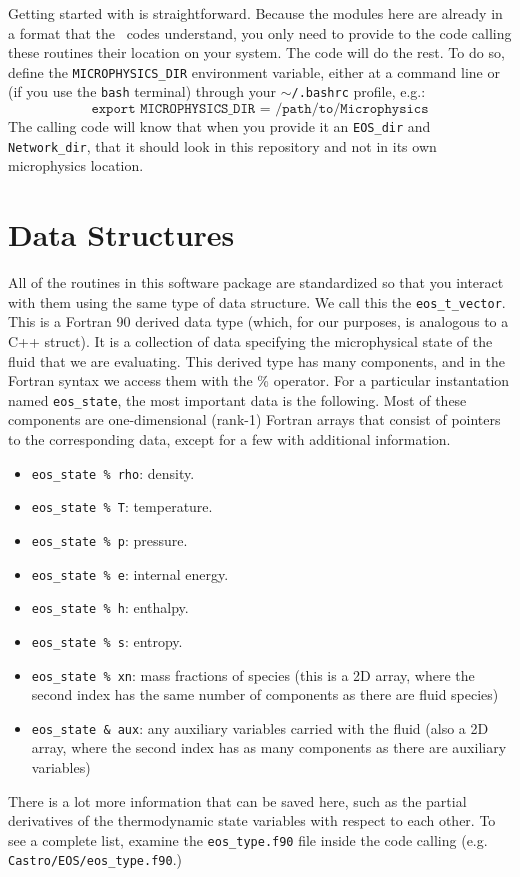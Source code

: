 \documentclass[11pt]{book}
\begin{document}
Getting started with \microphysics is straightforward. Because the
modules here are already in a format that the \boxlib\ codes
understand, you only need to provide to the code calling these
routines their location on your system. The code will do the rest. To
do so, define the {\tt MICROPHYSICS\_DIR} environment variable, either
at a command line or (if you use the {\tt bash} terminal) through your
{\tt $\sim$/.bashrc} profile, e.g.:
\begin{equation*}
  \texttt{export MICROPHYSICS\_DIR = /path/to/Microphysics}
\end{equation*}
The calling code will know that when you provide it an {\tt EOS\_dir}
and {\tt Network\_dir}, that it should look in this repository and not
in its own microphysics location.

\chapter{Data Structures}
\label{sec:data_structures}

All of the routines in this software package are standardized so that
you interact with them using the same type of data structure. We call
this the {\tt eos\_t\_vector}. This is a Fortran 90 derived data type
(which, for our purposes, is analogous to a C++ struct). It is a
collection of data specifying the microphysical state of the fluid
that we are evaluating.  This derived type has many components, and in
the Fortran syntax we access them with the \% operator. For a
particular instantation named {\tt eos\_state}, the most important
data is the following. Most of these components are one-dimensional
(rank-1) Fortran arrays that consist of pointers to the corresponding
data, except for a few with additional information.
\begin{itemize}
  \item {\tt eos\_state \% rho}: density.
  \item {\tt eos\_state \% T}: temperature.
  \item {\tt eos\_state \% p}: pressure.
  \item {\tt eos\_state \% e}: internal energy.
  \item {\tt eos\_state \% h}: enthalpy.
  \item {\tt eos\_state \% s}: entropy.
  \item {\tt eos\_state \% xn}: mass fractions of species (this is a
    2D array, where the second index has the same number of components
    as there are fluid species)
  \item {\tt eos\_state \& aux}: any auxiliary variables carried with
    the fluid (also a 2D array, where the second index has as many
    components as there are auxiliary variables)
\end{itemize}
There is a lot more information that can be saved here, such as the
partial derivatives of the thermodynamic state variables with respect
to each other. To see a complete list, examine the {\tt eos\_type.f90}
file inside the code calling \microphysics (e.g. {\tt
  Castro/EOS/eos\_type.f90}.)
\end{document}
